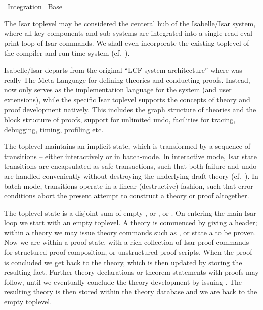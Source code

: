 %
\begin{isabellebody}%
\def\isabellecontext{Integration}%
%
\isadelimtheory
%
\endisadelimtheory
%
\isatagtheory
{}\isamarkupfalse%
\ Integration\isanewline
{}\ Base\isanewline
{}%
\endisatagtheory
{\isafoldtheory}%
%
\isadelimtheory
%
\endisadelimtheory
%
\isamarkuptrue%
%
\isamarkuptrue%
%
\begin{isamarkuptext}%
The Isar toplevel may be considered the centeral hub of the
  Isabelle/Isar system, where all key components and sub-systems are
  integrated into a single read-eval-print loop of Isar commands.  We
  shall even incorporate the existing {\ML} toplevel of the compiler
  and run-time system (cf.\ ).

  Isabelle/Isar departs from the original ``LCF system architecture''
  where {\ML} was really The Meta Language for defining theories and
  conducting proofs.  Instead, {\ML} now only serves as the
  implementation language for the system (and user extensions), while
  the specific Isar toplevel supports the concepts of theory and proof
  development natively.  This includes the graph structure of theories
  and the block structure of proofs, support for unlimited undo,
  facilities for tracing, debugging, timing, profiling etc.

  \medskip The toplevel maintains an implicit state, which is
  transformed by a sequence of transitions -- either interactively or
  in batch-mode.  In interactive mode, Isar state transitions are
  encapsulated as safe transactions, such that both failure and undo
  are handled conveniently without destroying the underlying draft
  theory (cf.~).  In batch mode,
  transitions operate in a linear (destructive) fashion, such that
  error conditions abort the present attempt to construct a theory or
  proof altogether.

  The toplevel state is a disjoint sum of empty , or
  , or .  On entering the main Isar loop we
  start with an empty toplevel.  A theory is commenced by giving a
  \isa{{\isasymTHEORY}} header; within a theory we may issue theory
  commands such as \isa{{\isasymDEFINITION}}, or state a \isa{{\isasymTHEOREM}} to be proven.  Now we are within a proof state, with a
  rich collection of Isar proof commands for structured proof
  composition, or unstructured proof scripts.  When the proof is
  concluded we get back to the theory, which is then updated by
  storing the resulting fact.  Further theory declarations or theorem
  statements with proofs may follow, until we eventually conclude the
  theory development by issuing \isa{{\isasymEND}}.  The resulting theory
  is then stored within the theory database and we are back to the
  empty toplevel.


\end{isamarkuptext}
\end{isabellebody}
